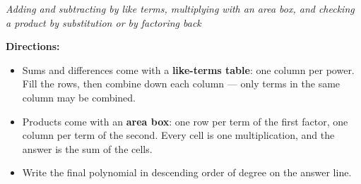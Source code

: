 \documentclass[12pt]{article}
\begin{document}

\noindent\emph{Adding and subtracting by like terms, multiplying with an area box, and checking a product by substitution or by factoring back}

\vspace{0.15cm}
\noindent\textbf{Directions:}
\begin{itemize}[leftmargin=0.9cm, itemsep=2pt, topsep=3pt]
  \item Sums and differences come with a \textbf{like-terms table}: one column
        per power. Fill the rows, then combine down each column --- only terms
        in the same column may be combined.
  \item Products come with an \textbf{area box}: one row per term of the first
        factor, one column per term of the second. Every cell is one
        multiplication, and the answer is the sum of the cells.
  \item Write the final polynomial in descending order of degree on the answer
        line.
\end{itemize}


\end{document}
